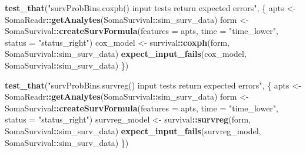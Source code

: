 \documentclass[
]{book}
\newenvironment{Shaded}{\begin{snugshade}}{\end{snugshade}}
\newcommand{\AttributeTok}[1]{\textcolor[rgb]{0.13,0.29,0.53}{#1}}
\newcommand{\FunctionTok}[1]{\textcolor[rgb]{0.13,0.29,0.53}{\textbf{#1}}}
\newcommand{\NormalTok}[1]{#1}
\newcommand{\OtherTok}[1]{\textcolor[rgb]{0.56,0.35,0.01}{#1}}
\newcommand{\SpecialCharTok}[1]{\textcolor[rgb]{0.81,0.36,0.00}{\textbf{#1}}}
\newcommand{\StringTok}[1]{\textcolor[rgb]{0.31,0.60,0.02}{#1}}
\begin{document}
\begin{Shaded}
\begin{Highlighting}[]
\FunctionTok{test\_that}\NormalTok{(}\StringTok{"\textasciigrave{}survProbBins.coxph()\textasciigrave{} input tests return expected errors"}\NormalTok{, \{}
\NormalTok{  apts }\OtherTok{\textless{}{-}}\NormalTok{ SomaReadr}\SpecialCharTok{::}\FunctionTok{getAnalytes}\NormalTok{(SomaSurvival}\SpecialCharTok{::}\NormalTok{sim\_surv\_data)}
\NormalTok{  form }\OtherTok{\textless{}{-}}\NormalTok{ SomaSurvival}\SpecialCharTok{::}\FunctionTok{createSurvFormula}\NormalTok{(}\AttributeTok{features =}\NormalTok{ apts, }
                                          \AttributeTok{time     =} \StringTok{"time\_lower"}\NormalTok{,}
                                          \AttributeTok{status   =} \StringTok{"status\_right"}\NormalTok{)}
\NormalTok{  cox\_model }\OtherTok{\textless{}{-}}\NormalTok{ survival}\SpecialCharTok{::}\FunctionTok{coxph}\NormalTok{(form, SomaSurvival}\SpecialCharTok{::}\NormalTok{sim\_surv\_data)}
  \FunctionTok{expect\_input\_fails}\NormalTok{(cox\_model, SomaSurvival}\SpecialCharTok{::}\NormalTok{sim\_surv\_data)}
\NormalTok{\})}

\FunctionTok{test\_that}\NormalTok{(}\StringTok{"\textasciigrave{}survProbBins.survreg()\textasciigrave{} input tests return expected errors"}\NormalTok{, \{}
\NormalTok{  apts }\OtherTok{\textless{}{-}}\NormalTok{ SomaReadr}\SpecialCharTok{::}\FunctionTok{getAnalytes}\NormalTok{(SomaSurvival}\SpecialCharTok{::}\NormalTok{sim\_surv\_data)}
\NormalTok{  form }\OtherTok{\textless{}{-}}\NormalTok{ SomaSurvival}\SpecialCharTok{::}\FunctionTok{createSurvFormula}\NormalTok{(}\AttributeTok{features =}\NormalTok{ apts, }
                                          \AttributeTok{time =} \StringTok{"time\_lower"}\NormalTok{,}
                                          \AttributeTok{status =} \StringTok{"status\_right"}\NormalTok{)}
\NormalTok{  survreg\_model }\OtherTok{\textless{}{-}}\NormalTok{ survival}\SpecialCharTok{::}\FunctionTok{survreg}\NormalTok{(form, SomaSurvival}\SpecialCharTok{::}\NormalTok{sim\_surv\_data)}
  \FunctionTok{expect\_input\_fails}\NormalTok{(survreg\_model, SomaSurvival}\SpecialCharTok{::}\NormalTok{sim\_surv\_data)}
\NormalTok{\})}


\end{Highlighting}
\end{Shaded}
\end{document}
